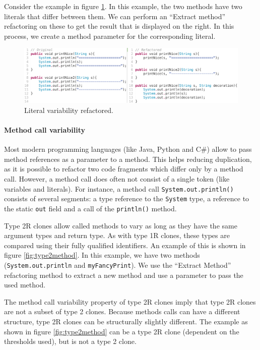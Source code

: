 Consider the example in figure \ref{fig:type2literal}. In this example, the two methods have two literals that differ between them. We can perform an ``Extract method'' refactoring on these to get the result that is displayed on the right. In this process, we create a method parameter for the corresponding literal.

\begin{figure}[H]
  \centering
  \includegraphics[width=1\columnwidth]{img/type2literal}
  \caption{Literal variability refactored.}
  \label{fig:type2literal}
\end{figure}

\paragraph{Method call variability}
Most modern programming languages (like Java, Python and C\#) allow to pass method references as a parameter to a method. This helps reducing duplication, as it is possible to refactor two code fragments which differ only by a method call. However, a method call does often not consist of a single token (like variables and literals). For instance, a method call \texttt{System.out.println()} consists of several segments: a type reference to the \texttt{System} type, a reference to the static \texttt{out} field and a call of the \texttt{println()} method.

Type 2R clones allow called methods to vary as long as they have the same argument types and return type. As with type 1R clones, these types are compared using their fully qualified identifiers. An example of this is shown in figure \ref{fig:type2method}. In this example, we have two methods (\texttt{System.out.println} and \texttt{myFancyPrint}). We use the ``Extract Method'' refactoring method to extract a new method and use a parameter to pass the used method.

The method call variability property of type 2R clones imply that type 2R clones are not a subset of type 2 clones. Because methods calls can have a different structure, type 2R clones can be structurally slightly different. The example as shown in figure \ref{fig:type2method} can be a type 2R clone (dependent on the thresholds used), but is not a type 2 clone.

